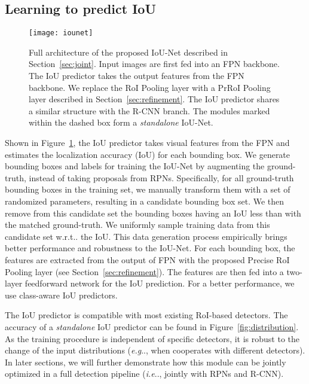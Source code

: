 \documentclass[runningheads]{llncs}
\makeatletter
\DeclareRobustCommand\onedot{\futurelet\@let@token\@onedot}
\def\@onedot{\ifx\@let@token.\else.\null\fi\xspace}
\def\eg{\emph{e.g}\onedot} \def\Eg{\emph{E.g}\onedot}
\def\ie{\emph{i.e}\onedot} \def\Ie{\emph{I.e}\onedot}
\def\wrt{w.r.t\onedot} \def\dof{d.o.f\onedot}
\makeatother
\begin{document}
\subsection{Learning to predict IoU}
\label{sec:predictiou}
\begin{figure}[!t]
    \centering
    \texttt{[image: iounet]}
    \caption{Full architecture of the proposed IoU-Net described in Section~\ref{sec:joint}. Input images are first fed into an FPN backbone. The IoU predictor takes the output features from the FPN backbone. We replace the RoI Pooling layer with a PrRoI Pooling layer described in Section~\ref{sec:refinement}. The IoU predictor shares a similar structure with the R-CNN branch. The modules marked within the dashed box form a \emph{standalone} IoU-Net.
}
    \label{fig:network}
\end{figure}

Shown in Figure~\ref{fig:network}, the IoU predictor takes visual features from the FPN and estimates the localization accuracy (IoU) for each bounding box.
We generate bounding boxes and labels for training the IoU-Net by augmenting the ground-truth, instead of taking proposals from RPNs. Specifically, for all ground-truth bounding boxes in the training set, we manually transform them with a set of randomized parameters, resulting in a candidate bounding box set. We then remove from this candidate set the bounding boxes having an IoU less than  with the matched ground-truth. We uniformly sample training data from this candidate set \wrt the IoU. This data generation process empirically brings better performance and robustness to the IoU-Net. For each bounding box, the features are extracted from the output of FPN with the proposed Precise RoI Pooling layer (see Section~\ref{sec:refinement}). The features are then fed into a two-layer feedforward network for the IoU prediction. For a better performance, we use class-aware IoU predictors.

The IoU predictor is compatible with most existing RoI-based detectors. 
The accuracy of a \emph{standalone} IoU predictor can be found in Figure~\ref{fig:distribution}. As the training procedure is independent of specific detectors, it is robust to the change of the input distributions (\eg, when cooperates with different detectors).
In later sections, we will further demonstrate how this module can be jointly optimized in a full detection pipeline (\ie, jointly with RPNs and R-CNN).
\end{document}
